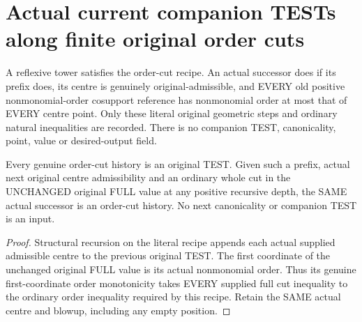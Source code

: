 \section{Actual current companion TESTs along finite original order cuts}

\begin{definition}
\label{hir:original-finite-order-cut-history}
\leanok
A reflexive tower satisfies the order-cut recipe. An actual successor does
if its prefix does, its centre is genuinely original-admissible, and EVERY
old positive nonmonomial-order cosupport reference has nonmonomial order
at most that of EVERY centre point. Only these literal original geometric
steps and ordinary natural inequalities are recorded. There is no companion
TEST, canonicality, point, value or desired-output field.
\end{definition}

\begin{theorem}
\label{hir:original-full-cut-supplies-finite-order-history}
\leanok
Every genuine order-cut history is an original TEST. Given such a prefix,
actual next original centre admissibility and an ordinary whole cut in the
UNCHANGED original FULL value at any positive recursive depth, the SAME
actual successor is an order-cut history. No next canonicality or companion
TEST is an input.
\end{theorem}
\begin{proof}
Structural recursion on the literal recipe appends each actual supplied
admissible centre to the previous original TEST. The first coordinate of
the unchanged original FULL value is its actual nonmonomial order. Thus
its genuine first-coordinate order monotonicity takes EVERY supplied full
cut inequality to the ordinary order inequality required by this recipe.
Retain the SAME actual centre and blowup, including any empty position.
\end{proof}

